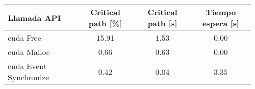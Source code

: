 \begin{table}[]
\centering

\begin{tabular}{lccc}
\toprule
Llamada API   & Critical path {[}\%{]} & Critical path {[}s{]} & Tiempo espera {[}s{]} \\
\midrule
cuda Free      & 15.91                  & 1.53                  & 0.00                  \\
cuda Malloc    & 0.66                   & 0.63                  & 0.00                  \\
cuda Event Synchronize & 0.42                   & 0.04                  & 3.35                 \\
\bottomrule
\end{tabular}

\end{table}